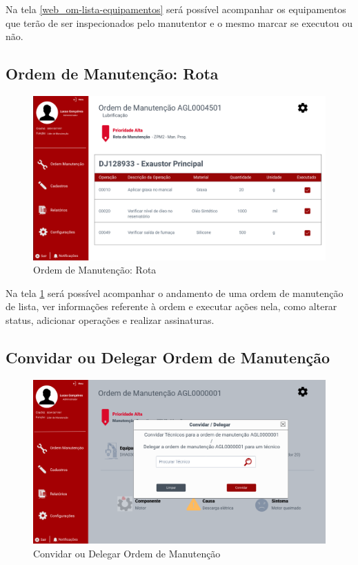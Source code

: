 Na tela \ref{web_om-lista-equipamentos} será possível acompanhar os equipamentos que terão de ser inspecionados pelo manutentor e o mesmo marcar se executou ou não.

\newpage
\subsection{Ordem de Manutenção: Rota}

\begin{figure}[htb]
	\caption{\label{web_om-rota}Ordem de Manutenção: Rota}
	\begin{center}
		\includegraphics[scale=0.40]{./Figuras/web/om-rota.png}
	\end{center}
\end{figure}

Na tela \ref{web_om-rota} será possível acompanhar o andamento de uma ordem de manutenção de lista, ver informações referente à ordem e executar ações nela, como alterar status, adicionar operações e realizar assinaturas.

\newpage
\subsection{Convidar ou Delegar Ordem de Manutenção}

\begin{figure}[htb]
	\caption{\label{web_om-convidar-delegar}Convidar ou Delegar Ordem de Manutenção}
	\begin{center}
		\includegraphics[scale=0.40]{./Figuras/web/om-convidar-delegar.png}
	\end{center}
\end{figure}

